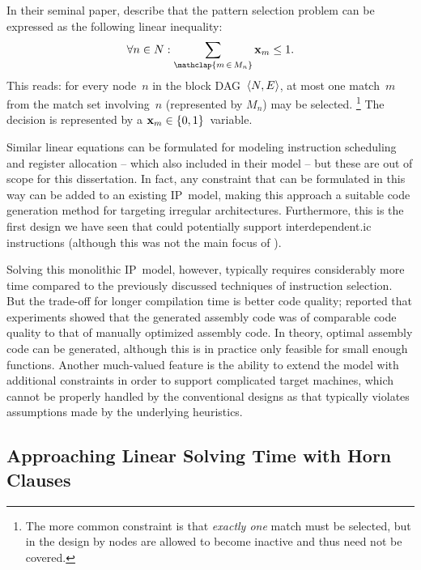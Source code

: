In their seminal paper, \citeauthor{WilsonEtAl:1994} describe that the
\gls{pattern selection} problem can be expressed as the following linear
inequality:
%
\begin{displaymath}
  \forall n \in N : \sum_{\mathclap{m \,\in\, M_n}} \mVar{x}_m \leq 1.
\end{displaymath}
%
This reads: for every \gls{node}~$n$ in the \gls{block DAG}~\mbox{$\mTuple{N,
    E}$}, at most one \gls{match}~$m$ from the \gls{match set} involving~$n$
(represented by $M_n$) may be selected.\!%
%
\footnote{%
  The more common \gls{constraint} is that \emph{exactly one} \gls{match} must
  be selected, but in the design by \citeauthor{WilsonEtAl:1994} \glspl{node}
  are allowed to become inactive and thus need not be covered.%
}
%
The decision is represented by a $\mVar{x}_m \in \mSet{0, 1}$~\gls{variable}.

Similar linear equations can be formulated for modeling \gls{instruction
  scheduling} and \gls{register allocation} -- which
\citeauthor{WilsonEtAl:1994} also included in their model -- but these are out
of scope for this dissertation.
%
In fact, any \gls{constraint} that can be formulated in this way can be added to
an existing \gls{IP}~model, making this approach a suitable \gls{code
  generation} method for targeting irregular architectures.
%
Furthermore, this is the first design we have seen that could potentially
support \gls{interdependent.ic} \glspl{instruction} (although this was not the
main focus of \citeauthor{WilsonEtAl:1994}).

Solving this monolithic \gls{IP}~model, however, typically requires considerably
more time compared to the previously discussed techniques of \gls{instruction
  selection}.
%
But the trade-off for longer compilation time is better code quality;
\citeauthor{WilsonEtAl:1994} reported that experiments showed that the generated
\gls{assembly code} was of comparable code quality to that of manually optimized
\gls{assembly code}.
%
In theory, optimal \gls{assembly code} can be generated, although this is in
practice only feasible for small enough \glspl{function}.
%
Another much-valued feature is the ability to extend the model with additional
\glspl{constraint} in order to support complicated \glspl{target machine}, which
cannot be properly handled by the conventional designs as that typically
violates assumptions made by the underlying heuristics.


\subsection{Approaching Linear Solving Time with Horn Clauses}

